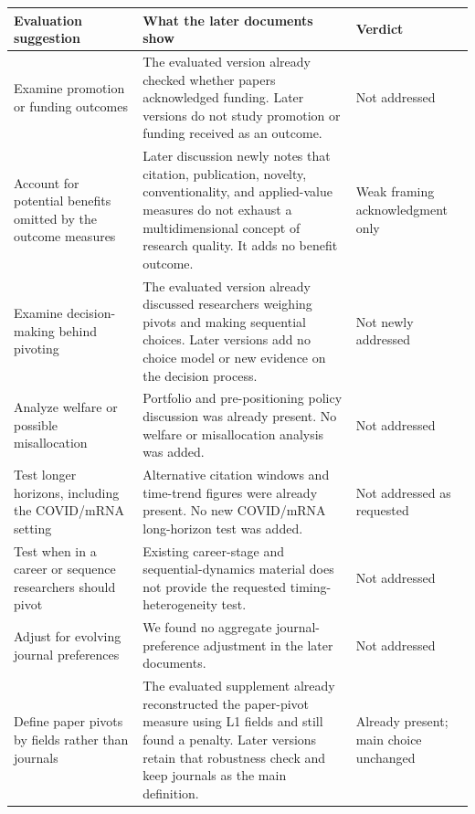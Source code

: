 \documentclass[
  11pt,
  letterpaper,
]{article}
\begin{document}
\begin{longtable}[]{@{}
  >{\raggedright\arraybackslash}p{}
  >{\raggedright\arraybackslash}p{}
  >{\raggedright\arraybackslash}p{}@{}}
\toprule\noalign{}
\begin{minipage}[b]{\linewidth}\raggedright
Evaluation suggestion
\end{minipage} & \begin{minipage}[b]{\linewidth}\raggedright
What the later documents show
\end{minipage} & \begin{minipage}[b]{\linewidth}\raggedright
Verdict
\end{minipage} \\
\midrule\noalign{}
\endhead
\bottomrule\noalign{}
\endlastfoot
Examine promotion or funding outcomes & The evaluated version already
checked whether papers acknowledged funding. Later versions do not study
promotion or funding received as an outcome. & Not addressed \\
Account for potential benefits omitted by the outcome measures & Later
discussion newly notes that citation, publication, novelty,
conventionality, and applied-value measures do not exhaust a
multidimensional concept of research quality. It adds no benefit
outcome. & Weak framing acknowledgment only \\
Examine decision-making behind pivoting & The evaluated version already
discussed researchers weighing pivots and making sequential choices.
Later versions add no choice model or new evidence on the decision
process. & Not newly addressed \\
Analyze welfare or possible misallocation & Portfolio and
pre-positioning policy discussion was already present. No welfare or
misallocation analysis was added. & Not addressed \\
Test longer horizons, including the COVID/mRNA setting & Alternative
citation windows and time-trend figures were already present. No new
COVID/mRNA long-horizon test was added. & Not addressed as requested \\
Test when in a career or sequence researchers should pivot & Existing
career-stage and sequential-dynamics material does not provide the
requested timing-heterogeneity test. & Not addressed \\
Adjust for evolving journal preferences & We found no aggregate
journal-preference adjustment in the later documents. & Not addressed \\
Define paper pivots by fields rather than journals & The evaluated
supplement already reconstructed the paper-pivot measure using L1 fields
and still found a penalty. Later versions retain that robustness check
and keep journals as the main definition. & Already present; main choice
unchanged \\
\end{longtable}
\end{document}
